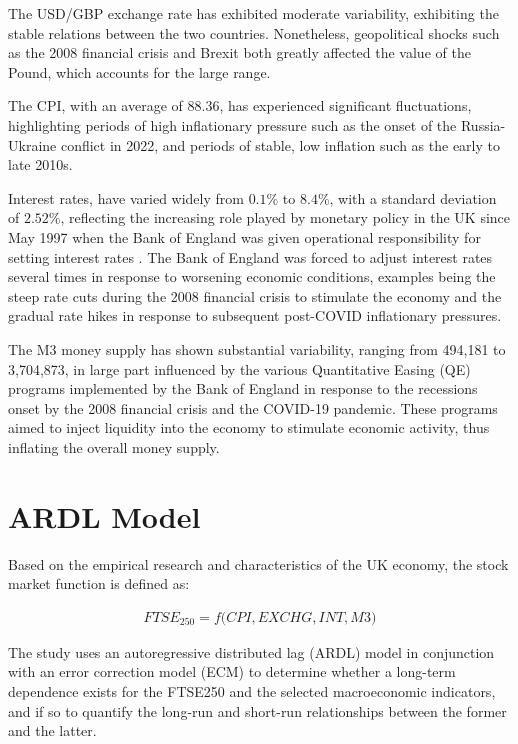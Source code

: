 \documentclass[11pt,a4paper]{article}
\begin{document}
The USD/GBP exchange rate has exhibited moderate variability, exhibiting the stable relations between 
the two countries. Nonetheless, geopolitical shocks such as the 2008 financial crisis and Brexit both greatly affected the value of the Pound, 
which accounts for the large range. 

The CPI, with an average of 88.36, has 
experienced significant fluctuations, highlighting periods of high inflationary pressure such as the onset of the Russia-Ukraine conflict in 2022, and periods of stable, low
inflation such as the early to late 2010s.

Interest rates, have varied widely from $0.1\%$ to $8.4\%$, with a standard deviation of $2.52\%$, reflecting the 
increasing role played by monetary policy in the UK since May 1997 when the Bank of England was given operational responsibility for setting interest rates \citep{king1997changes}. The Bank of England was forced to adjust interest rates 
several times in response to worsening economic conditions, examples being the steep rate cuts during the 2008 financial crisis to stimulate the economy and the gradual rate hikes in response to 
subsequent post-COVID inflationary pressures. 

The M3 money supply has shown substantial variability, ranging from 494,181 to 3,704,873, 
in large part influenced by the various Quantitative Easing (QE) programs implemented by the Bank of England 
in response to the recessions onset by the 2008 financial crisis and the COVID-19 pandemic. These programs aimed to inject liquidity into the economy to stimulate economic activity, thus inflating the overall money supply.

\section{ARDL Model}

Based on the empirical research and characteristics of the UK economy,
the stock market function is defined as:

\begin{align}
    FTSE_{250} = f\biggl(CPI, EXCHG, INT, M3\biggr) \label{eq:implicit}
\end{align}

The study uses an autoregressive distributed lag (ARDL) model in conjunction with 
an error correction model (ECM) to determine 
whether a long-term dependence exists for the FTSE250 and the selected macroeconomic 
indicators, and if so to quantify the long-run and short-run relationships
between the former and the latter. 
\end{document}
